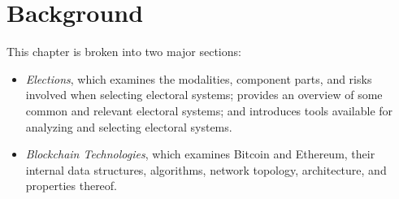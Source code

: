 \chapter{Background}\label{chap:background}

This chapter is broken into two major sections:


\begin{itemize}

  \item \emph{Elections}, which examines the modalities, component parts, and
    risks involved when selecting electoral systems; provides an overview of
    some common and relevant electoral systems; and introduces tools available
    for analyzing and selecting electoral systems.

  \item \emph{Blockchain Technologies}, which examines Bitcoin and Ethereum,
    their internal data structures, algorithms, network topology, architecture,
    and properties thereof.

\end{itemize}

% 




